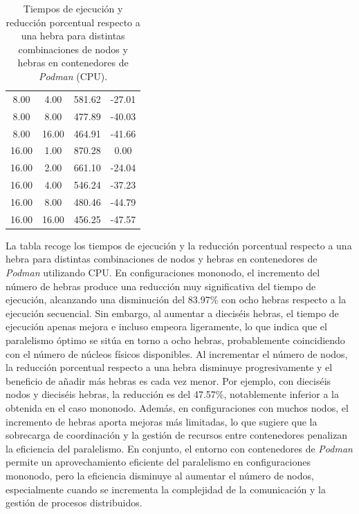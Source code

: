 \begin{table}[ht]
\begin{tabular}{|c|c|c|c|}
        8.00           & 4.00            & 581.62              & -27.01                         \\
        8.00           & 8.00            & 477.89              & -40.03                         \\
        8.00           & 16.00           & 464.91              & -41.66                         \\
        16.00          & 1.00            & 870.28              & 0.00                           \\
        16.00          & 2.00            & 661.10              & -24.04                         \\
        16.00          & 4.00            & 546.24              & -37.23                         \\
        16.00          & 8.00            & 480.46              & -44.79                         \\
        16.00          & 16.00           & 456.25              & -47.57                         \\
        \hline
    \end{tabular}
    \caption{Tiempos de ejecución y reducción porcentual respecto a una hebra para distintas combinaciones de nodos y hebras en contenedores de \textit{Podman} (CPU).}
    \label{tab:thread_sweep_ubuntu_\textit{Podman}_time}
\end{table}

La tabla recoge los tiempos de ejecución y la reducción porcentual respecto a una hebra para distintas combinaciones de nodos y hebras en contenedores de \textit{Podman} utilizando CPU. En configuraciones mononodo, el incremento del número de hebras produce una reducción muy significativa del tiempo de ejecución, alcanzando una disminución del 83.97\% con ocho hebras respecto a la ejecución secuencial. Sin embargo, al aumentar a dieciséis hebras, el tiempo de ejecución apenas mejora e incluso empeora ligeramente, lo que indica que el paralelismo óptimo se sitúa en torno a ocho hebras, probablemente coincidiendo con el número de núcleos físicos disponibles. Al incrementar el número de nodos, la reducción porcentual respecto a una hebra disminuye progresivamente y el beneficio de añadir más hebras es cada vez menor. Por ejemplo, con dieciséis nodos y dieciséis hebras, la reducción es del 47.57\%, notablemente inferior a la obtenida en el caso mononodo. Además, en configuraciones con muchos nodos, el incremento de hebras aporta mejoras más limitadas, lo que sugiere que la sobrecarga de coordinación y la gestión de recursos entre contenedores penalizan la eficiencia del paralelismo. En conjunto, el entorno con contenedores de \textit{Podman} permite un aprovechamiento eficiente del paralelismo en configuraciones mononodo, pero la eficiencia disminuye al aumentar el número de nodos, especialmente cuando se incrementa la complejidad de la comunicación y la gestión de procesos distribuidos.

